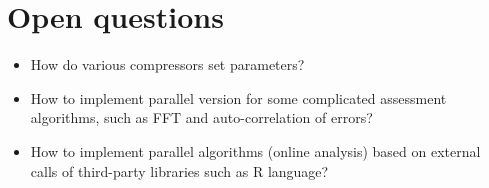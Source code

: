 \section{Open questions}

\begin{itemize}
\item
How do various compressors set parameters?

\item
How to implement parallel version for some complicated assessment algorithms, such as FFT and auto-correlation of errors?

\item 
How to implement parallel algorithms (online analysis) based on external calls of third-party libraries such as R language? 
\end{itemize}

